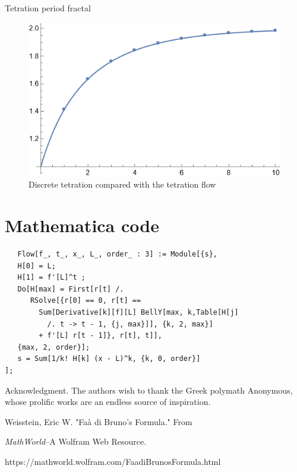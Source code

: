 \documentclass{article}
\theoremstyle{definition}
\begin{document}
Tetration period fractal
\begin{figure}
\centering
\includegraphics[]{Ackermann.png}
\caption{Discrete tetration compared with the tetration flow}
\label{fig:tetration}
\end{figure}




\section{Mathematica code}
\begin{verbatim}
   Flow[f_, t_, x_, L_, order_ : 3] := Module[{s},
   H[0] = L;
   H[1] = f'[L]^t ;
   Do[H[max] = First[r[t] /. 
      RSolve[{r[0] == 0, r[t] ==
        Sum[Derivative[k][f][L] BellY[max, k,Table[H[j]
          /. t -> t - 1, {j, max}]], {k, 2, max}] 
        + f'[L] r[t - 1]}, r[t], t]], 
   {max, 2, order}];
   s = Sum[1/k! H[k] (x - L)^k, {k, 0, order}]
];
\end{verbatim}

\begin{acknowledgment}{Acknowledgment.}
The authors wish to thank the Greek polymath Anonymous, whose prolific works are an endless source of inspiration.
\end{acknowledgment}

\begin{thebibliography}{1}
 Weisstein, Eric W. "Faà di Bruno's Formula." From

\textit{MathWorld}--A Wolfram Web Resource. 

https://mathworld.wolfram.com/FaadiBrunosFormula.html
\end{thebibliography}


\vfill\eject
\end{document}
